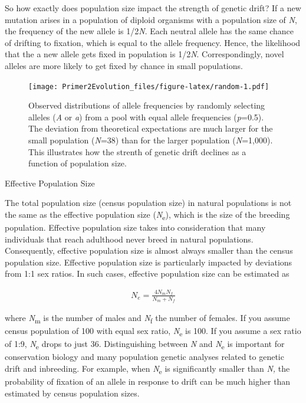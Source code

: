 \documentclass[
]{book}
\begin{document}
So how exactly does population size impact the strength of genetic drift? If a new mutation arises in a population of diploid organisms with a population size of \emph{N}, the frequency of the new allele is 1/2\emph{N}. Each neutral allele has the same chance of drifting to fixation, which is equal to the allele frequency. Hence, the likelihood that the a new allele gets fixed in population is 1/2\emph{N}. Correspondingly, novel alleles are more likely to get fixed by chance in small populations.

\begin{figure}
\centering
\texttt{[image: Primer2Evolution\_files/figure-latex/random-1.pdf]}
\caption{\label{fig:random}Observed distributions of allele frequencies by randomly selecting alleles (\emph{A} or \emph{a}) from a pool with equal allele frequencies (\emph{p}=0.5). The deviation from theoretical expectations are much larger for the small population (\emph{N}=38) than for the larger population (\emph{N}=1,000). This illustrates how the strenth of genetic drift declines as a function of population size.}
\end{figure}

Effective Population Size

The total population size (census population size) in natural populations is not the same as the effective population size (\emph{N}\textsubscript{e}), which is the size of the breeding population. Effective population size takes into consideration that many individuals that reach adulthood never breed in natural populations. Consequently, effective population size is almost always smaller than the census population size. Effective population size is particularly impacted by deviations from 1:1 sex ratios. In such cases, effective population size can be estimated as

\begin{align} 
N_e = \frac{4N_mN_f}{N_m+N_f} \label{eq:24}
\end{align}

where \emph{N}\textsubscript{m} is the number of males and \emph{N}\textsubscript{f} the number of females. If you assume census population of 100 with equal sex ratio, \emph{N}\textsubscript{e} is 100. If you assume a sex ratio of 1:9, \emph{N}\textsubscript{e} drops to just 36. Distinguishing between \emph{N} and \emph{N}\textsubscript{e} is important for conservation biology and many population genetic analyses related to genetic drift and inbreeding. For example, when \emph{N}\textsubscript{e} is significantly smaller than \emph{N,} the probability of fixation of an allele in response to drift can be much higher than estimated by census population sizes.
\end{document}
